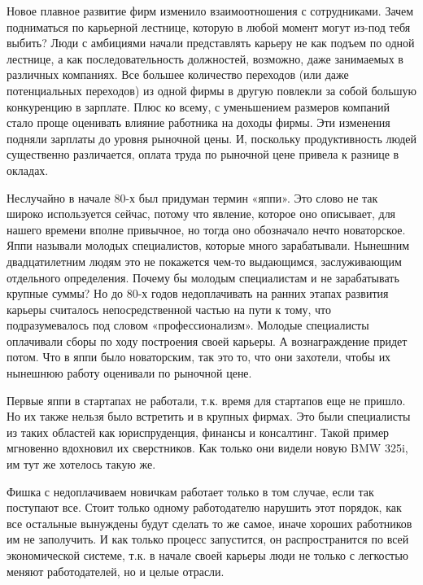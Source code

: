 \documentclass[ebook,12pt,oneside,openany]{memoir}
\begin{document}
Новое плавное развитие фирм изменило взаимоотношения с сотрудниками.
Зачем подниматься по карьерной лестнице, которую в любой момент могут
из-под тебя выбить? Люди с амбициями начали представлять карьеру не
как подъем по одной лестнице, а как последовательность должностей,
возможно, даже занимаемых в различных компаниях. Все большее
количество переходов (или даже потенциальных переходов) из одной фирмы
в другую повлекли за собой большую конкуренцию в зарплате. Плюс ко
всему, с уменьшением размеров компаний стало проще оценивать влияние
работника на доходы фирмы. Эти изменения подняли зарплаты до уровня
рыночной цены. И, поскольку продуктивность людей существенно
различается, оплата труда по рыночной цене привела к разнице в
окладах. \newline

Неслучайно в начале 80-х был придуман термин «яппи». Это слово не так
широко используется сейчас, потому что явление, которое оно описывает,
для нашего времени вполне привычное, но тогда оно обозначало нечто
новаторское. Яппи называли молодых специалистов, которые много
зарабатывали. Нынешним двадцатилетним людям это не покажется чем-то
выдающимся, заслуживающим отдельного определения. Почему бы молодым
специалистам и не зарабатывать крупные суммы? Но до 80-х годов
недоплачивать на ранних этапах развития карьеры считалось
непосредственной частью на пути к тому, что подразумевалось под словом
«профессионализм». Молодые специалисты оплачивали сборы по ходу
построения своей карьеры. А вознаграждение придет потом. Что в яппи
было новаторским, так это то, что они захотели, чтобы их нынешнюю
работу оценивали по рыночной цене. \newline

Первые яппи в стартапах не работали, т.к. время для стартапов еще не
пришло. Но их также нельзя было встретить и в крупных фирмах. Это были
специалисты из таких областей как юриспруденция, финансы и консалтинг.
Такой пример мгновенно вдохновил их сверстников. Как только они видели
новую BMW 325i, им тут же хотелось такую же. \newline

Фишка с недоплачиваем новичкам работает только в том случае, если так
поступают все. Стоит только одному работодателю нарушить этот порядок,
как все остальные вынуждены будут сделать то же самое, иначе хороших
работников им не заполучить. И как только процесс запустится, он
распространится по всей экономической системе, т.к. в начале своей
карьеры люди не только с легкостью меняют работодателей, но и целые
отрасли. \newline
\end{document}
